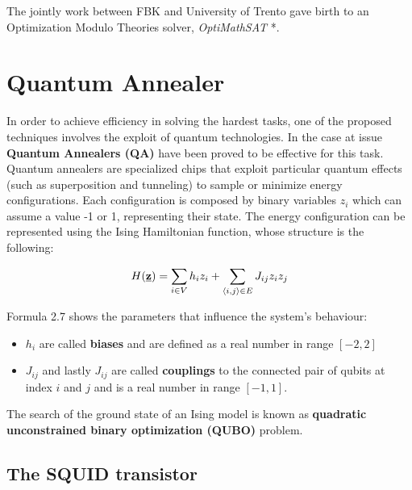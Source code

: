 The jointly work between FBK and University of Trento gave birth to an Optimization Modulo Theories solver, \textit{OptiMathSAT} \cite{pa25}*.

\section{Quantum Annealer}
\label{sec:quantum}

In order to achieve efficiency in solving the hardest tasks, one of the proposed techniques involves the exploit of quantum technologies. In the case at issue \textbf{Quantum Annealers (QA)} have been proved to be effective for this task. \\
Quantum annealers are specialized chips that exploit particular quantum effects (such as superposition and tunneling) to sample or minimize energy configurations. Each configuration is composed by binary variables $z_i$ which can assume a value -1 or 1, representing their state. The energy configuration can be represented using the Ising Hamiltonian function, whose structure is the following:

\begin{equation}
    H(\textbf{\underline{z}}) = \sum_{i \in V} h_iz_i + \sum_{\langle i,j\rangle \in E} J_{ij} z_iz_j
\end{equation}

Formula 2.7 shows the parameters that influence the system's behaviour: 

\begin{itemize}
    \item $h_i$ are called \textbf{biases} and are defined as a real number in range $[-2,2]$
    \item $J_{ij}$ and lastly $J_{ij}$ are called \textbf{couplings} to the connected pair of qubits at index $i$ and $j$ and is a real number in range $[-1,1]$.
\end{itemize}

The search of the ground state of an Ising model is known as \textbf{quadratic unconstrained binary optimization (QUBO)} problem. \\

\subsection{The SQUID transistor}

